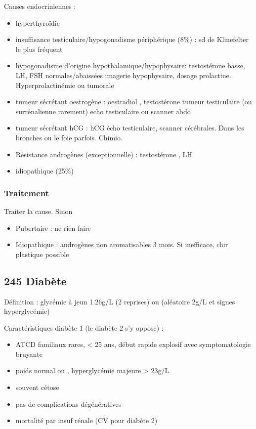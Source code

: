 \documentclass[11pt]{article}
\begin{document}
Causes endocriniennes :
\begin{itemize}
\item hyperthyroïdie
\item insuffisance testiculaire/hypogonadisme périphérique (8\%) : sd de Klinefelter
le plus fréquent
\item hypogonadisme d'origine hypothalamique/hypophysaire: testostérone basse, LH,
FSH normales/abaissées \thus imagerie hypophysaire, dosage
prolactine. Hyperprolactinémie ou tumorale
\item tumeur sécrétant oestrogène : oestradiol \inc, testostérone \dec \thus tumeur
testiculaire (ou surrénalienne rarement) \thus echo testiculaire ou scanner
abdo
\item tumeur sécrétant hCG : \inc hCG \thus écho testiculaire, scanner
cérébrales. Dans les bronches ou le foie parfois. Chimio.
\item Résistance androgènes (exceptionnelle) : testostérone \inc, LH \inc
\item idiopathique (25\%)
\end{itemize}

\subsubsection{Traitement}
\label{sec:orgedfc231}
Traiter la cause. Sinon
\begin{itemize}
\item Pubertaire : ne rien faire
\item Idiopathique : androgènes non aromatisables 3 mois. Si inefficace, chir
plastique possible
\end{itemize}
\subsection{245 Diabète}
\label{sec:orgcf3a6e3}
\begin{tcolorbox}
 Définition : glycémie à jeun \ge 1.26g/L (2 reprises) ou (aléatoire \ge 2g/L et signes hyperglycémie)\footnotemark
\end{tcolorbox}

Caractéristiques diabète 1 (le diabète 2 s'y oppose) : 
\begin{itemize}
\item ATCD familiaux rares, < 25 ans, début rapide explosif avec symptomatologie bruyante
\item poids normal ou \dec, hyperglycémie majeure > 23g/L
\item souvent cétose
\item pas de complications dégénératives
\item mortalité par insuf rénale (CV pour diabète 2)
\end{itemize}
\end{document}
